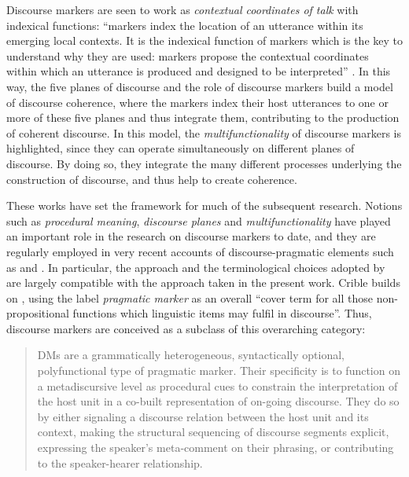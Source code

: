 Discourse markers are seen to work as \textit{contextual coordinates of talk} with indexical functions: “markers index the location of an utterance within its emerging local contexts. It is the indexical function of markers which is the key to understand why they are used: markers propose the contextual coordinates within which an utterance is produced and designed to be interpreted” \citep[315]{Schiffrin1987}. In this way, the five planes of discourse and the role of discourse markers build a model of discourse coherence, where the markers index their host utterances to one or more of these five planes and thus integrate them, contributing to the production of coherent discourse. In this model, the \textit{multifunctionality} of discourse markers is highlighted, since they can operate simultaneously on different planes of discourse. By doing so, they integrate the many different processes underlying the construction of discourse, and thus help to create coherence.

These works have set the framework for much of the subsequent research. Notions such as \textit{procedural meaning}, \textit{discourse planes} and \textit{multifunctionality} have played an important role in the research on discourse markers to date, and they are regularly employed in very recent accounts of discourse-pragmatic elements such as \citet{Ghezzi2014} and \citet{Crible2017,Crible2018}. In particular, the approach and the terminological choices adopted by \citet{Crible2017,Crible2018} are largely compatible with the approach taken in the present work. Crible builds on \citet[28]{Hansen2006}, using the label \textit{pragmatic marker} as an overall “cover term for all those non-propositional functions which linguistic items may fulfil in discourse”. Thus, discourse markers are conceived as a subclass of this overarching category:

\begin{quote}
DMs are a grammatically heterogeneous, syntactically optional, polyfunctional type of pragmatic marker. Their specificity is to function on a metadiscursive level as procedural cues to constrain the interpretation of the host unit in a co-built representation of on-going discourse. They do so by either signaling a discourse relation between the host unit and its context, making the structural sequencing of discourse segments explicit, expressing the speaker’s meta-comment on their phrasing, or contributing to the speaker-hearer relationship. \citep[35]{Crible2018}
\end{quote}

